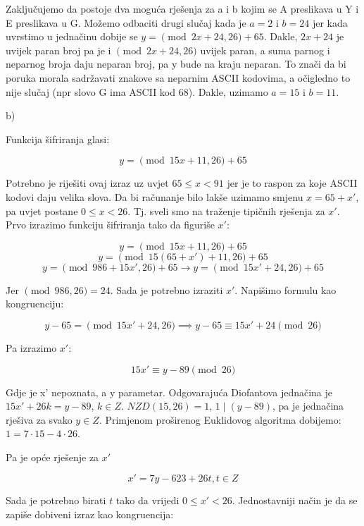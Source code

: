 \documentclass[12pt]{article}
\begin{document}
Zaključujemo da postoje dva moguća rješenja za a i b kojim se A preslikava u Y i E preslikava u G. Možemo odbaciti drugi slučaj kada je $a = 2$ i $b = 24$ jer kada uvrstimo u jednačinu dobije se $y = \pmod{2x + 24, 26} + 65$. Dakle, $2x + 24$ je uvijek paran broj pa je i $\pmod{2x + 24, 26}$ uvijek paran, a suma parnog i neparnog broja daju neparan broj, pa y bude na kraju neparan. To znači da bi poruka morala sadržavati znakove sa neparnim ASCII kodovima, a očigledno to nije slučaj (npr slovo G ima ASCII kod 68). Dakle, uzimamo $a = 15$ i $b = 11$.\vspace{10mm}

b)

\hspace{0.65cm}Funkcija šifriranja glasi:

$$y = \pmod{15x + 11, 26} + 65$$\vspace{1mm}

Potrebno je riješiti ovaj izraz uz uvjet $65 \leq x < 91$ jer je to raspon za koje ASCII kodovi daju velika slova. Da bi računanje bilo lakše uzimamo smjenu $x = 65 + x'$, pa uvjet postane $0 \leq x < 26$. Tj. sveli smo na traženje tipičnih rješenja za $x'$. Prvo izrazimo funkciju šifriranja tako da figuriše $x'$:

$$y = \pmod{15x + 11, 26} + 65$$
$$y = \pmod{15(65 + x') + 11, 26} + 65$$
$$y = \pmod{986 + 15x', 26} + 65 \to y = \pmod{15x' + 24, 26} + 65$$\vspace{1mm}


Jer $\pmod{986, 26} = 24$. Sada je potrebno izraziti $x'$. Napišimo formulu kao kongruenciju:

$$y - 65  = \pmod{15x' + 24, 26} \implies y - 65 \equiv 15x' + 24 \pmod{26}$$\vspace{1mm}

Pa izrazimo $x'$:

$$15x' \equiv y - 89\pmod{26}$$\vspace{1mm}

Gdje je x' nepoznata, a y parametar. Odgovarajuća Diofantova jednačina je $15x' + 26k = y - 89$, $k \in Z$. $NZD(15, 26) = 1$, $1 \mid (y - 89)$, pa je jednačina rješiva za svako $y \in Z$. Primjenom proširenog Euklidovog algoritma dobijemo: $1 = 7\cdot 15 - 4\cdot 26$.

Pa je opće rješenje za $x'$

$$x' = 7y - 623 + 26t, t \in Z$$\vspace{1mm}

Sada je potrebno birati $t$ tako da vrijedi $0 \leq x' < 26$. Jednostavniji način je da se zapiše dobiveni izraz kao kongruencija:
\end{document}
